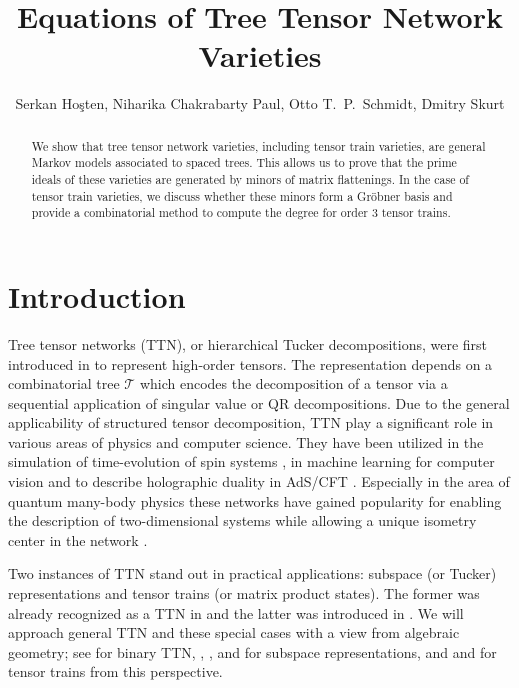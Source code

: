 \documentclass[12pt]{article}
\title{Equations of Tree Tensor Network Varieties}
\author{Serkan Ho\c{s}ten, Niharika Chakrabarty Paul, Otto T.~P.~Schmidt, Dmitry Skurt}
\date{}
\theoremstyle{definition}
\numberwithin{theorem}{section}
\begin{document}
\maketitle


\begin{abstract}
We show that tree tensor network varieties, including tensor train varieties, are general Markov models associated to spaced trees. This allows us to prove that the prime ideals of these varieties are generated by minors  of  matrix flattenings. In the case of tensor train varieties, we discuss whether these minors form a Gr\"obner basis and provide a combinatorial method to compute the degree for order $3$ tensor trains.
\end{abstract}

\section{Introduction}
Tree tensor networks (TTN), or hierarchical Tucker decompositions, were first introduced 
in \cite{HK09} to represent high-order tensors. The representation depends on a combinatorial tree $\mathscr{T}$ which encodes the decomposition of a tensor via a sequential application of singular value or QR decompositions. Due to the general applicability of structured tensor decomposition, TTN play a significant role in various areas of physics and computer science. They have been utilized in the simulation of time-evolution of spin systems \cite{krinitsin2025}, in machine learning for computer vision \cite{Cheng_2019} and to describe holographic duality in AdS/CFT \cite{Hayden_2016}. Especially in the area of quantum many-body physics these networks have gained popularity for enabling the description of two-dimensional systems while allowing a unique isometry center in the network \cite{humpert2025, krinitsin2025}.

Two instances of TTN stand out in practical applications: subspace (or Tucker) representations and tensor trains (or matrix product states). The former was already recognized as a TTN in \cite{HK09} and the latter was introduced in \cite{Oseledets_2011}. We will approach general TTN and these special cases with a view from algebraic geometry; see \cite{BUCZYNSKA_2015} for binary TTN, \cite{Breiding_2024}, \cite{Landsberg2012}, and \cite{Ye2018} for subspace representations, and \cite{BUCZYNSKA_2015} and \cite{BFHP25} for tensor trains from this perspective. 
\end{document}
